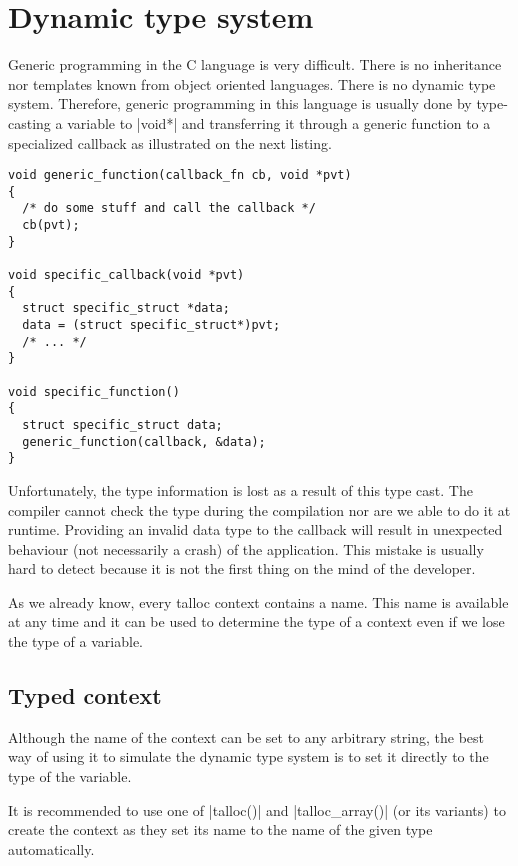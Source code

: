 \section{Dynamic type system}
\label{talloc:dyn-ts}

Generic programming in the C language is very difficult. There is no inheritance
nor templates known from object oriented languages. There is no dynamic type
system. Therefore, generic programming in this language is usually done by
type-casting a variable to |void*| and transferring it through a generic function
to a specialized callback as illustrated on the next listing.

\begin{lstlisting}[caption={Generic programming pattern},label=lst-generic-prg]
void generic_function(callback_fn cb, void *pvt)
{
  /* do some stuff and call the callback */
  cb(pvt);
}

void specific_callback(void *pvt)
{
  struct specific_struct *data;
  data = (struct specific_struct*)pvt;
  /* ... */
}

void specific_function()
{
  struct specific_struct data;
  generic_function(callback, &data);
}
\end{lstlisting}

\noindent
Unfortunately, the type information is lost as a result of this type cast. The
compiler cannot check the type during the compilation nor are we able to do it
at runtime. Providing an invalid data type to the callback will result
in unexpected behaviour (not necessarily a crash) of the application. This
mistake is usually hard to detect because it is not the first thing on the mind
of the developer.

As we already know, every talloc context contains a name. This name is available
at any time and it can be used to determine the type of a context even if we
lose the type of a variable.

\subsection{Typed context}

Although the name of the context can be set to any arbitrary string, the best
way of using it to simulate the dynamic type system is to set it directly to the
type of the variable.

It is recommended to use one of |talloc()| and |talloc_array()| (or its
variants) to create the context as they set its name to the name of the
given type automatically.


